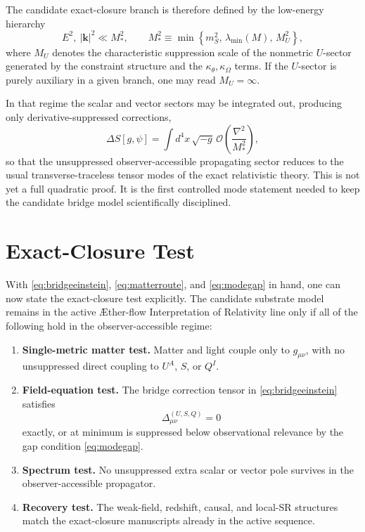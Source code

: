 \documentclass[11pt]{article}
\newcommand{\Aflow}{\AE{}ther-flow}
\newcommand{\TheoryName}{\Aflow{} Interpretation of Relativity}
\begin{document}
The candidate exact-closure branch is therefore defined by the low-energy hierarchy
\begin{equation}
E^2,\ |\mathbf{k}|^2
\ll
M_*^2,
\qquad
M_*^2
\equiv
\min\!\left\{
m_S^2,\,
\lambda_{\min}(M),\,
M_U^2
\right\},
\label{eq:modegap}
\end{equation}
where \(M_U\) denotes the characteristic suppression scale of the nonmetric \(U\)-sector generated by the constraint structure and the \(\kappa_\theta,\kappa_\Omega\) terms. If the \(U\)-sector is purely auxiliary in a given branch, one may read \(M_U=\infty\).

In that regime the scalar and vector sectors may be integrated out, producing only derivative-suppressed corrections,
\begin{equation}
\Delta S[g,\psi]
=
\int d^4x\,\sqrt{-g}\,
\mathcal O\!\left(\frac{\nabla^2}{M_*^2}\right),
\label{eq:deltasuppressed}
\end{equation}
so that the unsuppressed observer-accessible propagating sector reduces to the usual transverse-traceless tensor modes of the exact relativistic theory. This is not yet a full quadratic proof. It is the first controlled mode statement needed to keep the candidate bridge model scientifically disciplined.

\section{Exact-Closure Test}

With \eqref{eq:bridgeeinstein}, \eqref{eq:matterroute}, and \eqref{eq:modegap} in hand, one can now state the exact-closure test explicitly. The candidate substrate model remains in the active \TheoryName{} line only if all of the following hold in the observer-accessible regime:
\begin{enumerate}
    \item \textbf{Single-metric matter test.} Matter and light couple only to \(g_{\mu\nu}\), with no unsuppressed direct coupling to \(U^A\), \(S\), or \(Q^I\).
    \item \textbf{Field-equation test.} The bridge correction tensor in \eqref{eq:bridgeeinstein} satisfies
    \begin{equation}
    \Delta_{\mu\nu}^{(U,S,Q)} = 0
    \label{eq:deltatensorzero}
    \end{equation}
    exactly, or at minimum is suppressed below observational relevance by the gap condition \eqref{eq:modegap}.
    \item \textbf{Spectrum test.} No unsuppressed extra scalar or vector pole survives in the observer-accessible propagator.
    \item \textbf{Recovery test.} The weak-field, redshift, causal, and local-SR structures match the exact-closure manuscripts already in the active sequence.
\end{enumerate}
\end{document}
